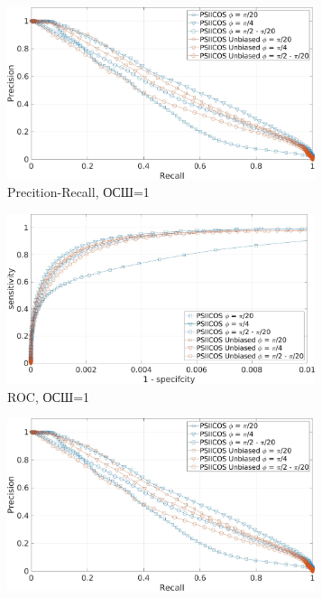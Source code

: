 \begin{figure}[htbp]
    \begin{subfigure}[t]{0.5\textwidth}
        \includegraphics[width=0.99\textwidth]{../images/pre_rec_3_ntw_snr_1.jpg}
        \caption{Precition-Recall, ОСШ=1}\label{fig:psiicos_vs_unbiased_3_ntw_a}
    \end{subfigure}
    \begin{subfigure}[t]{0.5\textwidth}
        \includegraphics[width=0.99\textwidth]{../images/roc_3_ntw_snr_1.jpg}
        \caption{ROC, ОСШ=1}\label{fig:psiicos_vs_unbiased_3_ntw_b}
    \end{subfigure}
    \begin{subfigure}[t]{0.5\textwidth}
        \includegraphics[width=0.99\textwidth]{../images/pre_rec_3_ntw_snr_1.jpg}

\end{subfigure}
\end{figure}
